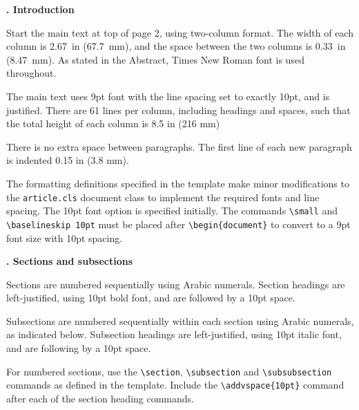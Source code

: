 \documentclass[twocolumn,10pt]{article} %
\renewcommand{\section}%
              [1]%
              {%
               \bgroup%
               \flushleft%
               \small\bf%
               \stepcounter{section}%
               \arabic{section}. #1%
               \par%
               \egroup%
              }%
\renewcommand{\subsection}%
              [1]%
              {%
               \bgroup%
               \flushleft%
               \small\em%
               \stepcounter{subsection}%
               \arabic{section}.%
               \arabic{subsection}. #1%
               \par%
               \egroup%
              }%
\renewcommand{\subsubsection}%
              [1]%
              {%
               \bgroup%
               \flushleft%
               \small\em%
               \stepcounter{subsubsection}%
               \arabic{section}.%
               \arabic{subsection}.%
               \arabic{subsubsection}. #1%
               \par%
               \egroup%
              }%
\begin{document}

\clearpage

\section{Introduction} \addvspace{10pt}

Start the main text at top of page 2, using two-column format. The width of each column is 2.67~in (67.7~mm), and the space between the two columns is 0.33~in (8.47~mm). As stated in the Abstract, Times New Roman font is used throughout.

The main text uses 9pt font with the line spacing set to exactly 10pt, and is justified. There are 61 lines per column, including headings and spaces, such that the total height of each column is 8.5 in (216 mm)

There is no extra space between paragraphs. The first line of each new paragraph is indented 0.15 in (3.8 mm).

The formatting definitions specified in the template make minor modifications to the \verb+article.cls+ document class to implement the required fonts and line spacing. The 10pt font option is specified initially. The commands \verb+\small+ and \verb+\baselineskip 10pt+ must be placed after \verb+\begin{document}+ to convert to a 9pt font size with 10pt spacing. 

\section{Sections and subsections} \addvspace{10pt}

Sections are numbered sequentially using Arabic numerals. Section headings are left-justified, using 10pt bold font, and are followed by a 10pt space.

Subsections are numbered sequentially within each section using Arabic numerals, as indicated below. Subsection headings are left-justified, using 10pt italic font, and are following by a 10pt space.

For numbered sections, use the \verb+\section+, \verb+\subsection+ and \verb+\subsubsection+ commands as defined in the template. Include the \verb+\addvspace{10pt}+ command after each of the section heading commands.
\end{document}
